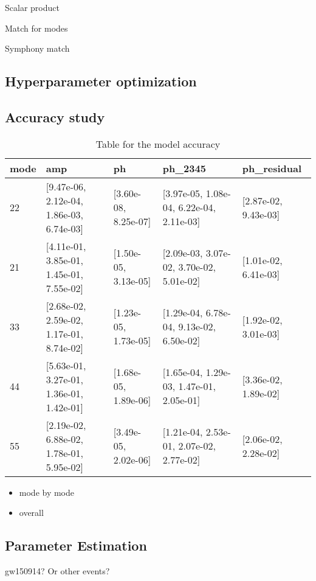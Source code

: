 \documentclass[twocolumn,showpacs,preprintnumbers,nofootinbib,prd,
superscriptaddress,10pt]{revtex4-1}
\begin{document}
Scalar product

Match for modes

Symphony match

\subsection{Hyperparameter optimization}
\label{sec:hyperparameter}

\subsection{Accuracy study}

\begin{table*}
\begin{tabular}{lllll}
\toprule
mode &                                       amp &                    ph &                                   ph\_2345 &           ph\_residual \\
\midrule
22 &  [9.47e-06, 2.12e-04, 1.86e-03, 6.74e-03] &  [3.60e-08, 8.25e-07] &  [3.97e-05, 1.08e-04, 6.22e-04, 2.11e-03] &  [2.87e-02, 9.43e-03] \\
21 &  [4.11e-01, 3.85e-01, 1.45e-01, 7.55e-02] &  [1.50e-05, 3.13e-05] &  [2.09e-03, 3.07e-02, 3.70e-02, 5.01e-02] &  [1.01e-02, 6.41e-03] \\
33 &  [2.68e-02, 2.59e-02, 1.17e-01, 8.74e-02] &  [1.23e-05, 1.73e-05] &  [1.29e-04, 6.78e-04, 9.13e-02, 6.50e-02] &  [1.92e-02, 3.01e-03] \\
44 &  [5.63e-01, 3.27e-01, 1.36e-01, 1.42e-01] &  [1.68e-05, 1.89e-06] &  [1.65e-04, 1.29e-03, 1.47e-01, 2.05e-01] &  [3.36e-02, 1.89e-02] \\
55 &  [2.19e-02, 6.88e-02, 1.78e-01, 5.95e-02] &  [3.49e-05, 2.02e-06] &  [1.21e-04, 2.53e-01, 2.07e-02, 2.77e-02] &  [2.06e-02, 2.28e-02] \\
\bottomrule
\end{tabular}
\caption{Table for the model accuracy}
\label{tab:table_accuracy}
\end{table*}

\label{sec:accuracy}
\begin{itemize}
	\item mode by mode
	\item overall
\end{itemize}

\subsection{Parameter Estimation}
\label{sec:PE}
gw150914? Or other events?
\end{document}
